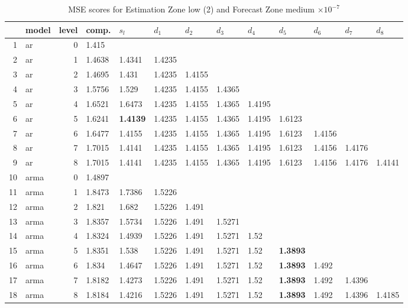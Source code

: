 \documentclass[10pt,a4paper]{article}
\begin{document}
\begin{table}[ht]
\centering
\caption{MSE scores for Estimation Zone low (2) and Forecast Zone medium $ \times 10^{-7}$} 
\begin{tabular}{rlrllllllllll}
  \hline
 & model & level & comp. & $s_l$ & $d_1$ & $d_2$ & $d_3$ & $d_4$ & $d_5$ & $d_6$ & $d_7$ & $d_8$ \\ 
  \hline
1 & ar &     0 & 1.415 &  &  &  &  &  &  &  &  &  \\ 
  2 & ar &     1 & 1.4638 & 1.4341 & 1.4235 &  &  &  &  &  &  &  \\ 
  3 & ar &     2 & 1.4695 & 1.431 & 1.4235 & 1.4155 &  &  &  &  &  &  \\ 
  4 & ar &     3 & 1.5756 & 1.529 & 1.4235 & 1.4155 & 1.4365 &  &  &  &  &  \\ 
  5 & ar &     4 & 1.6521 & 1.6473 & 1.4235 & 1.4155 & 1.4365 & 1.4195 &  &  &  &  \\ 
  6 & ar &     5 & 1.6241 & \textbf{1.4139} & 1.4235 & 1.4155 & 1.4365 & 1.4195 & 1.6123 &  &  &  \\ 
  7 & ar &     6 & 1.6477 & 1.4155 & 1.4235 & 1.4155 & 1.4365 & 1.4195 & 1.6123 & 1.4156 &  &  \\ 
  8 & ar &     7 & 1.7015 & 1.4141 & 1.4235 & 1.4155 & 1.4365 & 1.4195 & 1.6123 & 1.4156 & 1.4176 &  \\ 
  9 & ar &     8 & 1.7015 & 1.4141 & 1.4235 & 1.4155 & 1.4365 & 1.4195 & 1.6123 & 1.4156 & 1.4176 & 1.4141 \\ 
   \hline
10 & arma &     0 & 1.4897 &  &  &  &  &  &  &  &  &  \\ 
  11 & arma &     1 & 1.8473 & 1.7386 & 1.5226 &  &  &  &  &  &  &  \\ 
  12 & arma &     2 & 1.821 & 1.682 & 1.5226 & 1.491 &  &  &  &  &  &  \\ 
  13 & arma &     3 & 1.8357 & 1.5734 & 1.5226 & 1.491 & 1.5271 &  &  &  &  &  \\ 
  14 & arma &     4 & 1.8324 & 1.4939 & 1.5226 & 1.491 & 1.5271 & 1.52 &  &  &  &  \\ 
  15 & arma &     5 & 1.8351 & 1.538 & 1.5226 & 1.491 & 1.5271 & 1.52 & \textbf{1.3893} &  &  &  \\ 
  16 & arma &     6 & 1.834 & 1.4647 & 1.5226 & 1.491 & 1.5271 & 1.52 & \textbf{1.3893} & 1.492 &  &  \\ 
  17 & arma &     7 & 1.8182 & 1.4273 & 1.5226 & 1.491 & 1.5271 & 1.52 & \textbf{1.3893} & 1.492 & 1.4396 &  \\ 
  18 & arma &     8 & 1.8184 & 1.4216 & 1.5226 & 1.491 & 1.5271 & 1.52 & \textbf{1.3893} & 1.492 & 1.4396 & 1.4185 \\ 

\end{tabular}
\end{table}
\end{document}
